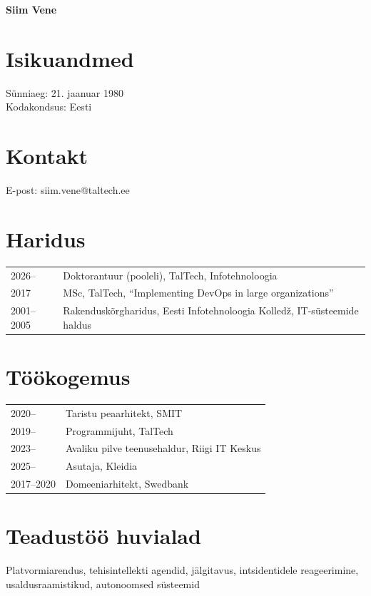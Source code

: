 \documentclass{TTUPhD}
\begin{document}
\begin{elulookirjeldus}
\textbf{Siim Vene}

\section*{Isikuandmed}
Sünniaeg: 21. jaanuar 1980\\
Kodakondsus: Eesti

\section*{Kontakt}
E-post: siim.vene@taltech.ee

\section*{Haridus}
\begin{tabular}{ll}
2026-- & Doktorantuur (pooleli), TalTech, Infotehnoloogia \\
2017 & MSc, TalTech, ``Implementing DevOps in large organizations'' \\
2001--2005 & Rakenduskõrgharidus, Eesti Infotehnoloogia Kolledž, IT-süsteemide haldus \\
\end{tabular}

\section*{Töökogemus}
\begin{tabular}{ll}
2020-- & Taristu peaarhitekt, SMIT \\
2019-- & Programmijuht, TalTech \\
2023-- & Avaliku pilve teenusehaldur, Riigi IT Keskus \\
2025-- & Asutaja, Kleidia \\
2017--2020 & Domeeniarhitekt, Swedbank \\
\end{tabular}

\section*{Teadustöö huvialad}
Platvormiarendus, tehisintellekti agendid, jälgitavus, intsidentidele reageerimine, usaldusraamistikud, autonoomsed süsteemid
\end{elulookirjeldus}
\end{document}
